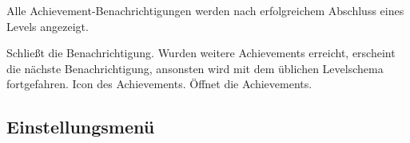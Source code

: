 \begin{center}
\setlength\fboxsep{20pt}
\setlength\fboxrule{1pt}
\end{center}

Alle Achievement-Benachrichtigungen werden nach erfolgreichem Abschluss eines Levels angezeigt.
\begin{requirements}
 Schließt die Benachrichtigung. Wurden weitere Achievements erreicht, erscheint die nächste Benachrichtigung, ansonsten wird mit dem üblichen Levelschema fortgefahren. 
 Icon des Achievements. Öffnet die Achievements.
\end{requirements} 

\subsection{Einstellungsmenü}

\begin{center}
\setlength\fboxsep{20pt}
\setlength\fboxrule{1pt}
\end{center}

